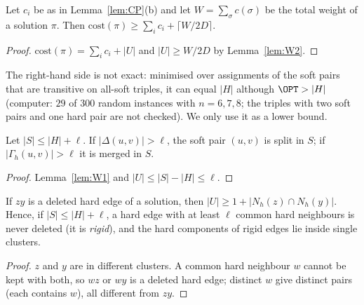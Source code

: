 \begin{corollary}\label{cor:LB}
Let $c_i$ be as in Lemma~\ref{lem:CP}(b) and let $W=\sum_{\sigma}c(\sigma)$ be the total weight of a solution $\pi$. Then $\mathrm{cost}(\pi)\ge\sum_ic_i+\lceil W/2D\rceil$.
\end{corollary}
\begin{proof}
$\mathrm{cost}(\pi)=\sum_ic_i+|U|$ and $|U|\ge W/2D$ by Lemma~\ref{lem:W2}.
\end{proof}
The right-hand side is not exact: minimised over assignments of the soft pairs that are transitive on all-soft triples, it can equal $|H|$ although $\OPT>|H|$ (computer: $29$ of $300$ random instances with $n=6,7,8$; the triples with two soft pairs and one hard pair are not checked). We only use it as a lower bound.

\begin{lemma}\label{lem:F1}
Let $|S|\le|H|+\ell$. If $|\Delta(u,v)|>\ell$, the soft pair $(u,v)$ is split in $S$; if $|\Gamma_h(u,v)|>\ell$ it is merged in $S$.
\end{lemma}
\begin{proof}
Lemma~\ref{lem:W1} and $|U|\le|S|-|H|\le\ell$.
\end{proof}

\begin{lemma}\label{lem:DEL}
If $zy$ is a deleted hard edge of a solution, then $|U|\ge1+|N_h(z)\cap N_h(y)|$. Hence, if $|S|\le|H|+\ell$, a hard edge with at least $\ell$ common hard neighbours is never deleted (it is \emph{rigid}), and the hard components of rigid edges lie inside single clusters.
\end{lemma}
\begin{proof}
$z$ and $y$ are in different clusters. A common hard neighbour $w$ cannot be kept with both, so $wz$ or $wy$ is a deleted hard edge; distinct $w$ give distinct pairs (each contains $w$), all different from $zy$.
\end{proof}

